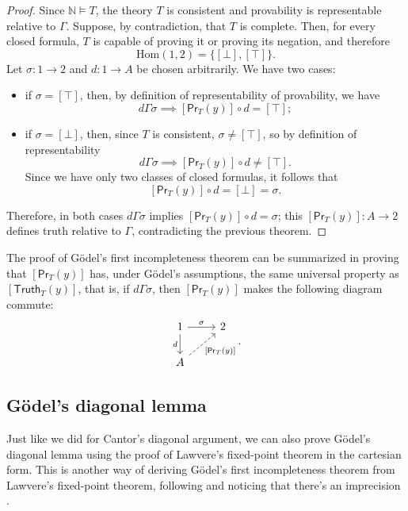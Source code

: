 \begin{proof}
    Since $\mathbb N\models T$, the theory $T$ is consistent and provability is representable relative to $\Gamma$.
    Suppose, by contradiction, that $T$ is complete. Then, for every closed formula, $T$ is capable of proving it or proving its negation, and therefore
    \[ \mathrm{Hom}(1, 2) = \{[\bot], [\top]\}. \]
    Let $\sigma : 1 \to 2$ and $d : 1 \to A$ be chosen arbitrarily. We have two cases:
    \begin{itemize}
        \item if $\sigma = [\top]$, then, by definition of representability of provability, we have
        \[ d\Gamma\sigma \implies [\mathsf{Pr}_T(y)] \circ d = [\top]; \]
        \item if $\sigma = [\bot]$, then, since $T$ is consistent, $\sigma \ne [\top]$, so by definition of representability
        \[ d\Gamma\sigma \implies [\mathsf{Pr}_T(y)] \circ d \ne [\top]. \]
        Since we have only two classes of closed formulas, it follows that
        \[ [\mathsf{Pr}_T(y)] \circ d = [\bot] = \sigma. \]
    \end{itemize}
    Therefore, in both cases $d\Gamma\sigma$ implies $[\mathsf{Pr}_T(y)] \circ d = \sigma$; this $[\mathsf{Pr}_T(y)] : A \to 2$
    defines truth relative to $\Gamma$, contradicting the previous theorem.
\end{proof}

\begin{remark}
    The proof of Gödel's first incompleteness theorem can be summarized in proving that $[\mathsf{Pr}_T(y)]$ has, under Gödel's assumptions,
    the same universal property as $[\mathsf{Truth}_T(y)]$, that is, if $d\Gamma\sigma$, then $[\mathsf{Pr}_T(y)]$ makes the following diagram commute:
    \[\begin{tikzcd}
        1 & 2 \\
        A
        \arrow["\sigma", from=1-1, to=1-2]
        \arrow["d"', from=1-1, to=2-1]
        \arrow["{[\mathsf{Pr}_T(y)]}"', dashed, from=2-1, to=1-2]
    \end{tikzcd}.\]
\end{remark}

\subsection*{Gödel's diagonal lemma}
Just like we did for Cantor's diagonal argument, we can also prove Gödel's diagonal lemma using the
proof of Lawvere's fixed-point theorem in the cartesian form. This is another way of deriving Gödel's first incompleteness theorem from Lawvere's fixed-point theorem, following \cite[Theorem~4, pp.~376--377]{Yanofsky2003} and noticing that there's an imprecision \cite{Vestrucci2026}.

